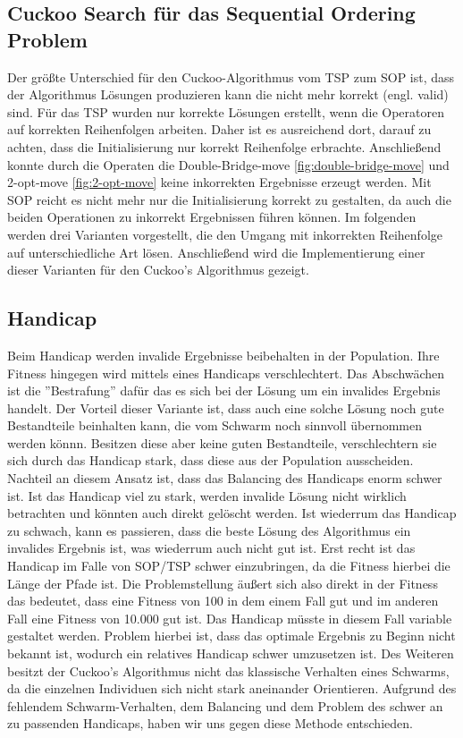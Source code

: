 \documentclass[conference]{IEEEtran}
\begin{document}
    \subsection{Cuckoo Search für das Sequential Ordering Problem}
      Der größte Unterschied für den Cuckoo-Algorithmus vom TSP zum SOP ist, dass der Algorithmus Lösungen 
      produzieren kann die nicht mehr korrekt (engl. valid) sind. Für das TSP wurden nur korrekte Lösungen erstellt, wenn die 
      Operatoren auf korrekten Reihenfolgen arbeiten. Daher ist es ausreichend dort, darauf zu achten, dass die Initialisierung 
      nur korrekt Reihenfolge erbrachte. Anschließend konnte durch die Operaten die Double-Bridge-move 
      \ref{fig:double-bridge-move} und 2-opt-move \ref{fig:2-opt-move} keine inkorrekten Ergebnisse erzeugt werden.
      Mit SOP reicht es nicht mehr nur die Initialisierung korrekt zu gestalten, da auch die 
      beiden Operationen zu inkorrekt Ergebnissen führen können.
      Im folgenden werden drei Varianten vorgestellt, die den Umgang mit inkorrekten Reihenfolge auf unterschiedliche
      Art lösen. Anschließend wird die Implementierung einer dieser Varianten für den Cuckoo's Algorithmus gezeigt. 

    \subsection{Handicap}
      Beim Handicap werden invalide 
      Ergebnisse beibehalten in der Population. Ihre Fitness hingegen wird mittels eines Handicaps 
      verschlechtert. Das Abschwächen ist die ''Bestrafung'' dafür das es sich bei der 
      Lösung um ein invalides Ergebnis handelt. Der Vorteil dieser Variante ist, dass auch eine solche 
      Lösung noch gute Bestandteile beinhalten kann, die vom Schwarm noch sinnvoll übernommen werden könnn. 
      Besitzen diese aber keine guten Bestandteile, verschlechtern sie sich durch das Handicap stark, dass diese aus der
      Population ausscheiden. Nachteil an diesem Ansatz ist, dass das Balancing des Handicaps 
      enorm schwer ist. Ist das Handicap viel zu stark, werden invalide Lösung nicht wirklich 
      betrachten und könnten auch direkt gelöscht werden. Ist wiederrum das Handicap zu schwach, 
      kann es passieren, dass die beste Lösung des Algorithmus ein invalides Ergebnis ist, was 
      wiederrum auch nicht gut ist. Erst recht ist das Handicap im Falle von SOP/TSP schwer 
      einzubringen, da die Fitness hierbei die Länge der Pfade ist. Die Problemstellung äußert 
      sich also direkt in der Fitness das bedeutet, dass eine Fitness von 100 in dem einem Fall
      gut und im anderen Fall eine Fitness von 10.000 gut ist. Das Handicap müsste in diesem Fall 
      variable gestaltet werden. Problem hierbei ist, dass das optimale Ergebnis zu Beginn nicht 
      bekannt ist, wodurch ein relatives Handicap schwer umzusetzen ist. Des Weiteren besitzt der Cuckoo's Algorithmus
      nicht das klassische Verhalten eines Schwarms, da die einzelnen Individuen sich nicht stark aneinander Orientieren.
      Aufgrund des fehlendem Schwarm-Verhalten, dem Balancing und dem Problem des schwer an zu passenden Handicaps, 
      haben wir uns gegen diese Methode entschieden.
\end{document}
